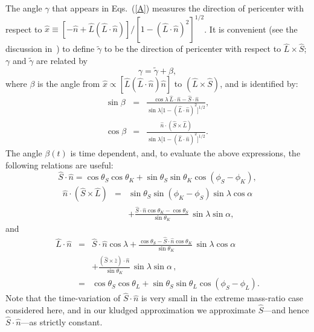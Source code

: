\documentclass[12pt]{iopart}
\def\be{\begin{equation}}
\def\ee{\end{equation}}
\def\bea{\begin{eqnarray}}
\def\eea{\end{eqnarray}}
\begin{document}
The angle $\gamma$ that appears in Eqs.\ (\ref{A}) measures the direction of pericenter with respect to
$\hat x \equiv [-\hat n + \hat L (\hat L\cdot \hat n)]/[1-(\hat L\cdot \hat n)^2]^{1/2}$. It is convenient (see the discussion in~\cite{BC}) to define $\tilde\gamma$ to be the direction of pericenter with respect to $\hat L \times \hat S$; $\gamma$  and $\tilde \gamma$ are related by
\be
\label{beta}
\gamma = \tilde\gamma + \beta,
\ee
where $\beta$ is the angle from $\hat x \propto [\hat L(\hat L \cdot \hat n) \hat n] $ to $(\hat L \times \hat S)$, and is identified by:
\begin{eqnarray}\label{sinbeta}
\sin\beta &=& \frac{\cos\lambda\, \hat L\cdot\hat n -\hat S\cdot \hat n }
{\sin\lambda\bigl[1 - (\hat L\cdot\hat n)^2\bigr]^{1/2}}, \nonumber \\
\cos\beta &=& \frac{\hat n \cdot (\hat S \times \hat L)}
{\sin\lambda\bigl[1 - (\hat L\cdot\hat n)^2\bigr]^{1/2} }.
\end{eqnarray}
The angle $\beta(t)$ is time dependent, and, to evaluate the above expressions, the following relations are useful:
\be
\label{SdotN}
{ \hat S}\cdot{ \hat n} = \cos\theta_S \cos\theta_K
+ \sin\theta_S \sin\theta_K \cos(\phi_S-\phi_K),
\ee
\bea\label{ScrossLdotN}
\hat n \cdot (\hat S \times \hat L) & = &
\sin\theta_S \sin(\phi_K-\phi_S)\sin\lambda \cos\alpha \nonumber \\
& &+ \frac{\hat S\cdot\hat n \cos\theta_K -\cos\theta_S}{\sin\theta_K}
\, \sin\lambda \sin\alpha,
\eea
and
\bea
\label{LdotN}
{ \hat L}\cdot{ \hat n} & = & { \hat S}\cdot{ \hat n}\cos\lambda
+ \frac{\cos\theta_S - \hat S\cdot\hat n \cos\theta_K}{\sin\theta_K}
\, \sin\lambda \cos\alpha \nonumber \\
& & + \frac{(\hat S \times \bar z)\cdot \hat n}
{\sin\theta_K}  \, \sin\lambda \sin\alpha\,, \nonumber \\
& = & \cos\theta_S \cos\theta_L +
\sin\theta_S \sin\theta_L \cos(\phi_S-\phi_L).
\eea
Note that the time-variation of ${ \hat S}\cdot{ \hat n}$ is very small in the extreme mass-ratio case considered here, and in our kludged approximation we approximate $\hat S$---and hence ${\hat S}\cdot{\hat n}$---as strictly constant.
\end{document}

